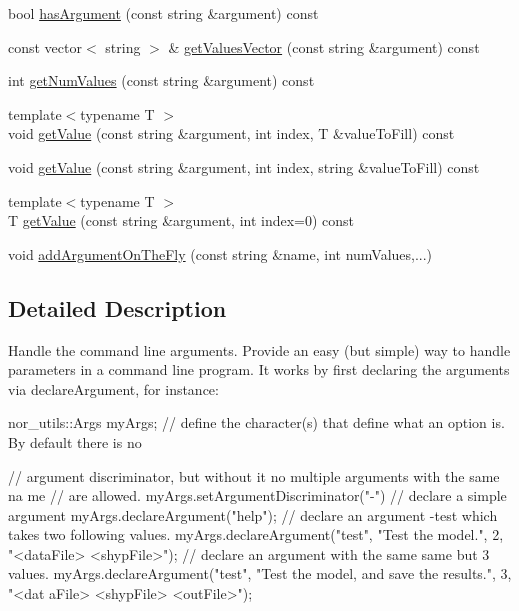 \begin{DoxyCompactItemize}
\item 
bool \hyperlink{classnor__utils_1_1Args_afea52d01709ed91c31dac2912c4b9c29}{hasArgument} (const string \&argument) const 
\item 
const vector$<$ string $>$ \& \hyperlink{classnor__utils_1_1Args_a28f5efea36c356579ceac99f36fbe234}{getValuesVector} (const string \&argument) const 
\item 
int \hyperlink{classnor__utils_1_1Args_ac3c186e3ec1f41097b922c29ec79abee}{getNumValues} (const string \&argument) const 
\item 
{\footnotesize template$<$typename T $>$ }\\void \hyperlink{classnor__utils_1_1Args_ac809235729078db4ee13778b106b8b49}{getValue} (const string \&argument, int index, T \&valueToFill) const 
\item 
void \hyperlink{classnor__utils_1_1Args_a9fe8a682a695155105e086a62f0a64bb}{getValue} (const string \&argument, int index, string \&valueToFill) const 
\item 
{\footnotesize template$<$typename T $>$ }\\T \hyperlink{classnor__utils_1_1Args_a87c679bdea3c5590ee71a672902fb4f5}{getValue} (const string \&argument, int index=0) const 
\item 
void \hyperlink{classnor__utils_1_1Args_aa5afeb4418624d75a719eeffa4e8fd61}{addArgumentOnTheFly} (const string \&name, int numValues,...)
\end{DoxyCompactItemize}


\subsection{Detailed Description}
Handle the command line arguments. Provide an easy (but simple) way to handle parameters in a command line program. It works by first declaring the arguments via declareArgument, for instance: 
\begin{DoxyCode}
 nor_utils::Args myArgs;
 // define the character(s) that define what an option is. By default there is no
      
 // argument discriminator, but without it no multiple arguments with the same na
      me
 // are allowed.
 myArgs.setArgumentDiscriminator("-")
 // declare a simple argument
 myArgs.declareArgument("help"); 
 // declare an argument -test which takes two following values.
 myArgs.declareArgument("test", "Test the model.", 2, "<dataFile> <shypFile>");
 // declare an argument with the same same but 3 values.
 myArgs.declareArgument("test", "Test the model, and save the results.", 3, "<dat
      aFile> <shypFile> <outFile>");
\end{DoxyCode}


